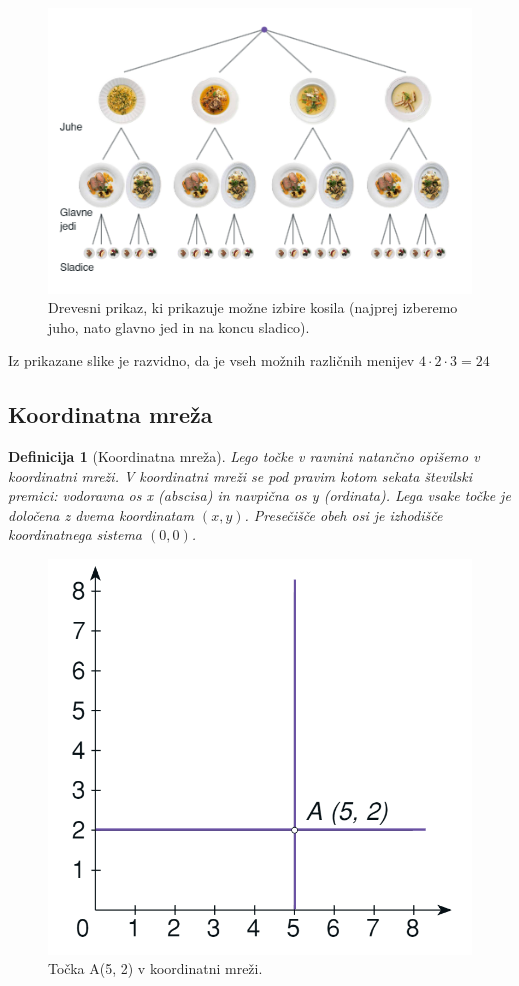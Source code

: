 \documentclass{article}
\newtheorem{definicija}{Definicija}[subsection]
\begin{document}
\begin{figure}[h]
    \includegraphics[width=\linewidth]{drevesniPrikaz.png}
    \centering
    \caption{Drevesni prikaz, ki prikazuje možne izbire kosila (najprej izberemo juho, nato glavno jed in na koncu sladico).}
\end{figure}

Iz prikazane slike je razvidno, da je vseh možnih različnih menijev $4 \cdot 2 \cdot 3 = 24$


\pagebreak
\subsection{Koordinatna mreža}

\begin{definicija}[Koordinatna mreža]
    Lego točke v ravnini natančno opišemo v koordinatni mreži. V koordinatni mreži se pod pravim kotom sekata številski premici: vodoravna os x (abscisa) in navpična os y (ordinata). Lega vsake točke je določena z dvema koordinatam $(x, y)$. Presečišče obeh osi je izhodišče koordinatnega sistema $(0,0)$.
\end{definicija}

\begin{figure}[h]
    \includegraphics[width=0.7\linewidth]{koordinatnaMreza.png}
    \centering
    \caption{Točka A(5, 2) v koordinatni mreži.}
\end{figure}
\end{document}
